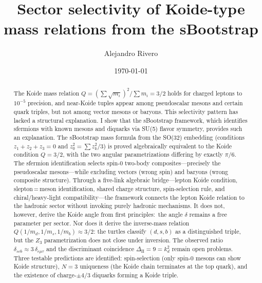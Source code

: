\documentclass[prd,twocolumn,superscriptaddress,nofootinbib]{revtex4-2}
\begin{document}
\title{Sector selectivity of Koide-type mass relations from the sBootstrap}

\author{Alejandro Rivero}

\date{\today}

\begin{abstract}
The Koide mass relation $Q = (\sum\sqrt{m_i})^2/\sum m_i = 3/2$ holds
for charged leptons to $10^{-5}$ precision, and near-Koide tuples appear
among pseudoscalar mesons and certain quark triples, but not among vector
mesons or baryons.  This selectivity pattern has lacked a structural
explanation.  I show that the sBootstrap framework, which identifies
sfermions with known mesons and diquarks via SU(5) flavor symmetry,
provides such an explanation.  The sBootstrap mass formula from the SO(32)
embedding (conditions $z_1+z_2+z_3=0$ and $z_0^2=\sum z_k^2/3$) is proved
algebraically equivalent to the Koide condition $Q=3/2$, with the two angular
parametrizations differing by exactly $\pi/6$.  The sfermion identification
selects spin-0 two-body composites---precisely the pseudoscalar
mesons---while excluding vectors (wrong spin) and baryons (wrong composite
structure).  Through a five-link algebraic bridge---lepton Koide condition,
slepton\,=\,meson identification, shared charge structure, spin-selection
rule, and chiral/heavy-light compatibility---the framework connects the
lepton Koide relation to the hadronic sector without invoking purely
hadronic mechanisms.  It does not, however, derive the Koide angle from
first principles:\ the angle $\delta$ remains a free parameter per sector.
Nor does it derive the inverse-mass relation
$Q(1/m_d,1/m_s,1/m_b)\approx 3/2$: the turtles classify $(d,s,b)$ as
a distinguished triple, but the $Z_3$ parametrization does not close
under inversion.  The observed ratio
$\delta_{scb}\approx 3\,\delta_{e\mu\tau}$ and the discriminant coincidence
$\Delta_{\text{II}}=9=k_d^2$ remain open problems.
Three testable predictions are identified:
spin-selection (only spin-0 mesons can show Koide structure),
$N=3$ uniqueness (the Koide chain terminates at the top quark), and
the existence of charge-$\pm 4/3$ diquarks forming a Koide triple.
\end{abstract}

\maketitle

\end{document}
